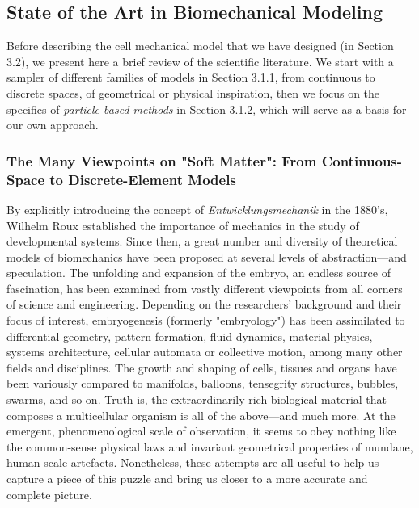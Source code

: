 \subsection{State of the Art in Biomechanical Modeling}


Before describing the cell mechanical model that we have designed (in Section 3.2), we present here a brief review of the scientific literature. We start with a sampler of different families of models in Section 3.1.1, from continuous to discrete spaces, of geometrical or physical inspiration, then we focus on the specifics of \textit{particle-based methods} in Section 3.1.2, which will serve as a basis for our own approach.


\subsubsection{The Many Viewpoints on "Soft Matter": From Continuous-Space to Discrete-Element Models}


By explicitly introducing the concept of \textit{Entwicklungsmechanik} in the 1880's, Wilhelm Roux established the importance of mechanics in the study of developmental systems. Since then, a great number and diversity of theoretical models of biomechanics have been proposed at several levels of abstraction---and speculation. The unfolding and expansion of the embryo, an endless source of fascination, has been examined from vastly different viewpoints from all corners of science and engineering. Depending on the researchers' background and their focus of interest, embryogenesis (formerly "embryology") has been assimilated to differential geometry, pattern formation, fluid dynamics, material physics, systems architecture, cellular automata or collective motion, among many other fields and disciplines. The growth and shaping of cells, tissues and organs have been variously compared to manifolds, balloons, tensegrity structures, bubbles, swarms, and so on. Truth is, the extraordinarily rich biological material that composes a multicellular organism is all of the above---and much more. At the emergent, phenomenological scale of observation, it seems to obey nothing like the common-sense physical laws and invariant geometrical properties of mundane, human-scale artefacts. Nonetheless, these attempts are all useful to help us capture a piece of this puzzle and bring us closer to a more accurate and complete picture.


